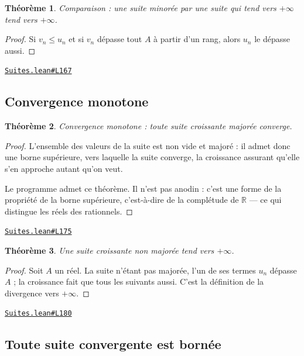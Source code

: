 \documentclass[11pt,a4paper]{article}
\theoremstyle{definition}
\theoremstyle{plain}
\newtheorem{theoreme}{Théorème}
\newcommand{\source}[2]{\par\smallskip\noindent\hfill{\footnotesize\href{#1}{\texttt{#2}}}\par\smallskip}
\begin{document}
\begin{theoreme}
Comparaison : une suite minorée par une suite qui tend vers $+\infty$ tend vers
$+\infty$.
\end{theoreme}

\begin{proof}
Si $v_n \le u_n$ et si $v_n$ dépasse tout $A$ à partir d'un rang, alors $u_n$ le dépasse
aussi.
\end{proof}
\source{https://github.com/Commutator-IO/learn-lean/blob/main/cours/02-lycee/03-suites/Suites.lean\#L167}{Suites.lean\#L167}

\subsection{Convergence monotone}

\begin{theoreme}
Convergence monotone : toute suite croissante majorée converge.
\end{theoreme}

\begin{proof}
L'ensemble des valeurs de la suite est non vide et majoré : il admet donc une borne
supérieure, vers laquelle la suite converge, la croissance assurant qu'elle s'en approche
autant qu'on veut.

Le programme admet ce théorème. Il n'est pas anodin : c'est une forme de la propriété de
la borne supérieure, c'est-à-dire de la complétude de $\mathbb{R}$ — ce qui distingue les
réels des rationnels.
\end{proof}
\source{https://github.com/Commutator-IO/learn-lean/blob/main/cours/02-lycee/03-suites/Suites.lean\#L175}{Suites.lean\#L175}

\begin{theoreme}
Une suite croissante non majorée tend vers $+\infty$.
\end{theoreme}

\begin{proof}
Soit $A$ un réel. La suite n'étant pas majorée, l'un de ses termes $u_n$ dépasse $A$ ;
la croissance fait que tous les suivants aussi. C'est la définition de la divergence vers
$+\infty$.
\end{proof}
\source{https://github.com/Commutator-IO/learn-lean/blob/main/cours/02-lycee/03-suites/Suites.lean\#L180}{Suites.lean\#L180}

\subsection{Toute suite convergente est bornée}
\end{document}
